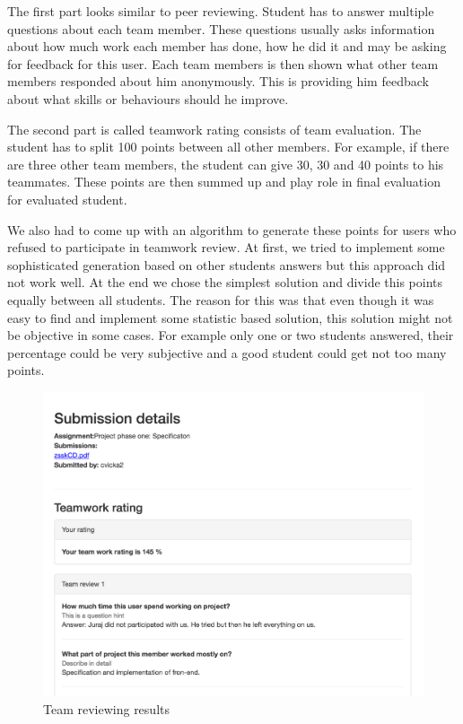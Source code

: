 The first part looks similar to peer reviewing. Student has to answer multiple questions about each team member. These questions usually asks information about how much work each member has done, how he did it and may be asking for feedback for this user. Each team members is then shown what other team members responded about him anonymously. This is providing him feedback about what skills or behaviours should he improve.

The second part is called teamwork rating consists of team evaluation. The student has to split 100 points between all other members. For example, if there are three other team members, the student can give 30, 30 and 40 points to his teammates. These points are then summed up and play role in final evaluation for evaluated student. 

We also had to come up with an algorithm to generate these points for users who refused to participate in teamwork review. At first, we tried to implement some sophisticated generation based on other students answers but this approach did not work well. At the end we chose the simplest solution and divide this points equally between all students. The reason for this was that even though it was easy to find and implement some statistic based solution, this solution might not be objective in some cases. For example only one or two students answered, their percentage could be very subjective and a good student could get not too many points.


\begin{figure}[h]
    \centering
    \includegraphics[width=\textwidth]{images/teamreview.png}
    \caption{Team reviewing results}
    \label{team_reviewing}
\end{figure}

